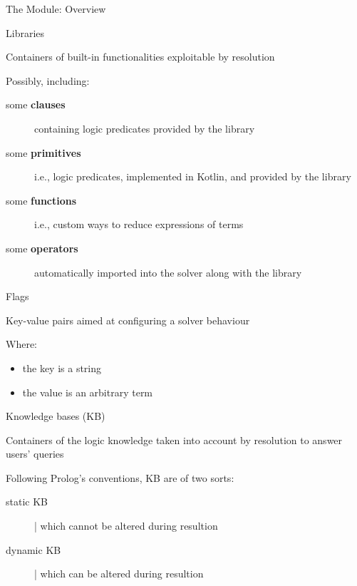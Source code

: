 \documentclass[handout]{beamer}
\begin{document}
\begin{frame}[allowframebreaks]{The  Module: Overview}
    \framebreak

    \begin{block}{Libraries}
        \begin{center}
            Containers of built-in functionalities exploitable by resolution
        \end{center}

        Possibly, including:
        \begin{description}
            \item[some \textbf{clauses}] containing logic predicates provided by the library
            \item[some \textbf{primitives}] i.e., logic predicates, implemented in Kotlin, and provided by the library
            \item[some \textbf{functions}] i.e., custom ways to reduce expressions of terms
            \item[some \textbf{operators}] automatically imported into the solver along with the library
        \end{description}
    \end{block}

    \framebreak

    \begin{block}{Flags}
        \begin{center}
            Key-value pairs aimed at configuring a solver behaviour
        \end{center}

        Where:
        \begin{itemize}
            \item the key is a string
            \item the value is an arbitrary term
        \end{itemize}
    \end{block}

    \framebreak

    \begin{block}{Knowledge bases (KB)}
        \begin{center}
            Containers of the logic knowledge taken into account by resolution to answer users' queries
        \end{center}

        Following Prolog's conventions, KB are of two sorts:
        \begin{description}
            \item[static KB] | which cannot be altered during resultion
            \item[dynamic KB] | which can be altered during resultion
        \end{description}
    \end{block}


\end{frame}
\end{document}
